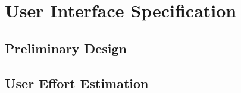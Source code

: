 \chapter{User Interface Specification}

\section{Preliminary Design}

\section{User Effort Estimation}
